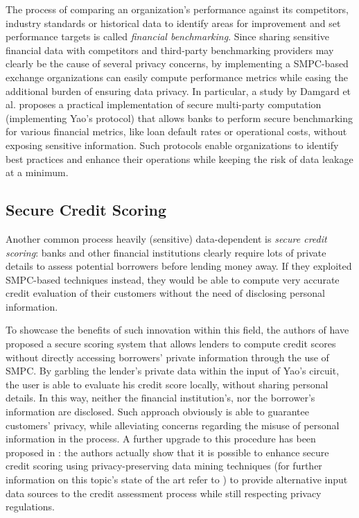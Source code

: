 \documentclass[12pt]{article}
\begin{document}
The process of comparing an organization's performance against its competitors, industry standards or historical data to identify areas for improvement and set performance targets is called \textit{financial benchmarking}. Since sharing sensitive financial data with competitors and third-party benchmarking providers may clearly be the cause of several privacy concerns, by implementing a SMPC-based exchange organizations can easily compute performance metrics while easing the additional burden of ensuring data privacy.
In particular, a study by Damgard et al. \cite{Benchmarking} proposes a practical implementation of secure multi-party computation (implementing Yao's protocol) that allows banks to perform secure benchmarking for various financial metrics, like loan default rates or operational costs, without exposing sensitive information. Such protocols enable organizations to identify best practices and enhance their operations while keeping the risk of data leakage at a minimum.

\subsection{Secure Credit Scoring}

Another common process heavily (sensitive) data-dependent is \textit{secure credit scoring}: banks and other financial institutions clearly require lots of private details to assess potential borrowers before lending money away. If they exploited SMPC-based techniques instead, they would be able to compute very accurate credit evaluation of their customers without the need of disclosing personal information.

To showcase the benefits of such innovation within this field, the authors of \cite{Scoring} have proposed a secure scoring system that allows lenders to compute credit scores without directly accessing borrowers' private information through the use of SMPC. By garbling the lender's private data within the input of Yao's circuit, the user is able to evaluate his credit score locally, without sharing personal details. In this way, neither the financial institution's, nor the borrower's information are disclosed. Such approach obviously is able to guarantee customers' privacy, while alleviating concerns regarding the misuse of personal information in the process. A further upgrade to this procedure has been proposed in \cite{ScoringMining}: the authors actually show that it is possible to enhance secure credit scoring using privacy-preserving data mining techniques (for further information on this topic's state of the art refer to \cite{Mining}) to provide alternative input data sources to the credit assessment process while still respecting privacy regulations.
\end{document}
